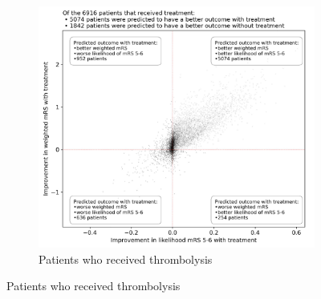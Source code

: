 \begin{figure}
\centering
\begin{subfigure}{.7\textwidth}
  \centering
  \captionsetup{width=.9\linewidth}
  \includegraphics[trim={0 0 0 1.7cm}, clip, width=1\linewidth]{./images/p4_scatter_treated}
  \caption{\footnotesize{Patients who received thrombolysis}}
  \label{fig:scatter_receive}
\end{subfigure}

\vspace{5mm}



\end{figure}
